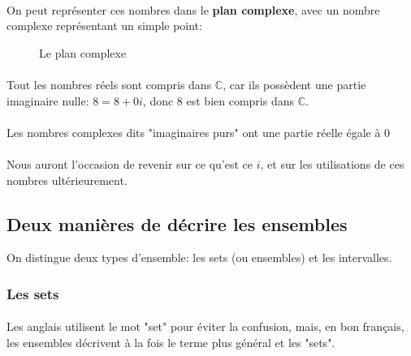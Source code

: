 \documentclass[a4paper]{book}
\begin{document}
    \paragraph{}
    On peut représenter ces nombres dans le \textbf{plan complexe}, avec un nombre complexe représentant un simple point:
    
    \begin{figure}[H]
        \centering
        \caption{Le plan complexe}
        \label{fig:complexplane}
    \end{figure}
    
    \paragraph{}
    Tout les nombres réels sont compris dans $\mathds{C}$, car ils possèdent une partie imaginaire nulle:
    $8 = 8 + 0i$, donc $8$ est bien compris dans $\mathds{C}$.
    \paragraph{}
    Les nombres complexes dits "imaginaires purs" ont une partie réelle égale à $0$
    
    \paragraph{}
    Nous auront l'occasion de revenir sur ce qu'est ce $i$, et sur les utilisations de ces nombres ultérieurement.
    
    \subsection{Deux manières de décrire les ensembles}
    On distingue deux types d'ensemble: les sets (ou ensembles) et les intervalles.
    \subsubsection{Les sets}
    \paragraph{}
    Les anglais utilisent le mot "set" pour éviter la confusion, mais, en bon français, les ensembles décrivent à la fois le terme plus général et les "sets".
    
\end{document}
